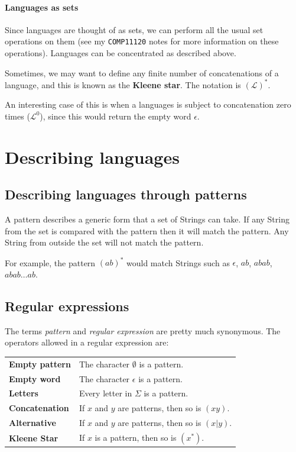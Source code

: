 \paragraph{Languages as sets} Since languages are thought of as sets, we can
perform all the usual set operations on them (see my {\tt COMP11120} notes for
more information on these operations). Languages can be concentrated as
described above.

Sometimes, we may want to define any finite number of concatenations of a
language, and this is known as the {\bf Kleene star}. The notation is
$(\mathcal{L})^*$.

An interesting case of this is when a languages is subject to concatenation zero
times ($\mathcal{L}^0$), since this would return the empty word $\epsilon$.


\section{Describing languages}

\subsection{Describing languages through patterns}

A pattern describes a generic form that a set of Strings can take. If any String
from the set is compared with the pattern then it will match the pattern. Any
String from outside the set will not match the pattern.

For example, the pattern $(ab)^*$ would match Strings such as $\epsilon$, $ab$,
$abab$, $abab \dots ab$.


\subsection{Regular expressions}

The terms {\it pattern} and {\it regular expression} are pretty much synonymous.
The operators allowed in a regular expression are:

\begin{center}
  \begin{tabular}{>{\bfseries} l l}
    Empty pattern & The character $\emptyset$ is a pattern.\\
    Empty word & The character $\epsilon$ is a pattern.\\
    Letters & Every letter in $\Sigma$ is a pattern.\\
    \rowcolor{Gray}
    Concatenation & If $x$ and $y$ are patterns, then so is $(xy)$.\\
    \rowcolor{Gray}
    Alternative & If $x$ and $y$ are patterns, then so is $(x|y)$.\\
    \rowcolor{Gray}
    Kleene Star & If $x$ is a pattern, then so is $(x^*)$.
  \end{tabular}
\end{center}

